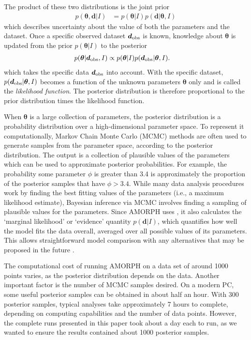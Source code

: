 \documentclass[review]{elsarticle}
\newcommand{\params}{\boldsymbol{\theta}}
\newcommand{\data}{\boldsymbol{d}}
\newcommand{\info}{I}
\begin{document}
The
product of these two distributions is the joint prior
\begin{align}
p(\params, \data | \info) &= p(\params | \info)p(\data | \params, \info)
\end{align}
which describes uncertainty about the value of both the parameters and the
dataset. Once a specific observed dataset $\data_{\rm obs}$ is known, knowledge about
$\params$ is updated from the prior $p(\params | \info)$ to the posterior
\begin{align}
p(\params | \data_{\rm obs}, \info) &\propto
    p(\params | \info)p(\data_{\rm obs} | \params, \info).
\end{align}
which takes the specific data $\data_{\rm obs}$ into account. With the specific dataset,
$p(\data_{\rm obs} | \params,\info)$ becomes a function of the
unknown parameters $\params$ only and is called the {\em likelihood function}.
The posterior distribution is therefore proportional to the prior distribution
times the likelihood function.

When $\params$ is a large collection of parameters, the posterior distribution
is a probability distribution over a high-dimensional parameter space. To
represent it computationally, Markov Chain Monte Carlo (MCMC) methods are
often used to generate samples from the parameter space, according to the
posterior distribution. The output is a collection of plausible values of the
parameters which can be used to approximate posterior probabilities.
For example, the probability some parameter $\phi$ is greater than 3.4
is approximately the proportion of the posterior samples that have
$\phi > 3.4$. While many data analysis procedures work by finding the
best fitting values of the parameters (i.e., a maximum likelihood estimate),
Bayesian inference via MCMC involves finding a sampling of plausible values
for the parameters. Since AMORPH uses \citet{dnest4}, it also calculates
the `marginal likelihood' or `evidence' quantity $p(\data | \info)$, which
quantifies how well the model fits the data overall, averaged over all
possible values of its parameters. This allows straightforward model comparison
with any alternatives that may be proposed in the future
\citep{skilling2006nested}.

The computational cost of running AMORPH on a data set of around 1000
points varies, as the posterior distribution depends on the data.
Another important factor is the number of MCMC samples desired.
On a modern PC, some useful posterior samples can be obtained in about
half an hour. With 300 posterior samples, typical analyses take approximately 7 hours to complete, depending on computing capabilities and the number of data points. However, the complete runs presented in this paper took
about a day each to run, as we wanted to ensure the results contained
about 1000 posterior samples.
\end{document}
